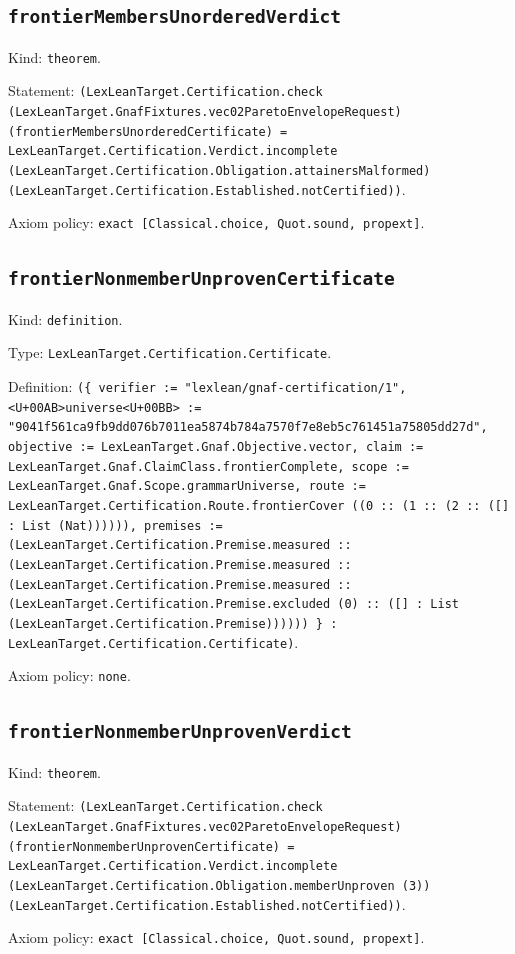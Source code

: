 \documentclass[11pt]{article}
\begin{document}
\subsection*{\texttt{frontierMembersUnorderedVerdict}}
\noindent Kind: \texttt{theorem}.\par
\noindent Statement: \texttt{(LexLeanTarget.Certification.check (LexLeanTarget.GnafFixtures.vec02ParetoEnvelopeRequest) (frontierMembersUnorderedCertificate) = LexLeanTarget.Certification.Verdict.incomplete (LexLeanTarget.Certification.Obligation.attainersMalformed) (LexLeanTarget.Certification.Established.notCertified))}.\par
\noindent Axiom policy: \texttt{exact [Classical.choice, Quot.sound, propext]}.\par
\subsection*{\texttt{frontierNonmemberUnprovenCertificate}}
\noindent Kind: \texttt{definition}.\par
\noindent Type: \texttt{LexLeanTarget.Certification.Certificate}.\par
\noindent Definition: \texttt{(\{ verifier := "lexlean/gnaf-certification/1", <U+00AB>universe<U+00BB> := "9041f561ca9fb9dd076b7011ea5874b784a7570f7e8eb5c761451a75805dd27d", objective := LexLeanTarget.Gnaf.Objective.vector, claim := LexLeanTarget.Gnaf.ClaimClass.frontierComplete, scope := LexLeanTarget.Gnaf.Scope.grammarUniverse, route := LexLeanTarget.Certification.Route.frontierCover ((0 :: (1 :: (2 :: ([] : List (Nat)))))), premises := (LexLeanTarget.Certification.Premise.measured :: (LexLeanTarget.Certification.Premise.measured :: (LexLeanTarget.Certification.Premise.measured :: (LexLeanTarget.Certification.Premise.excluded (0) :: ([] : List (LexLeanTarget.Certification.Premise)))))) \} : LexLeanTarget.Certification.Certificate)}.\par
\noindent Axiom policy: \texttt{none}.\par
\subsection*{\texttt{frontierNonmemberUnprovenVerdict}}
\noindent Kind: \texttt{theorem}.\par
\noindent Statement: \texttt{(LexLeanTarget.Certification.check (LexLeanTarget.GnafFixtures.vec02ParetoEnvelopeRequest) (frontierNonmemberUnprovenCertificate) = LexLeanTarget.Certification.Verdict.incomplete (LexLeanTarget.Certification.Obligation.memberUnproven (3)) (LexLeanTarget.Certification.Established.notCertified))}.\par
\noindent Axiom policy: \texttt{exact [Classical.choice, Quot.sound, propext]}.\par
\end{document}
